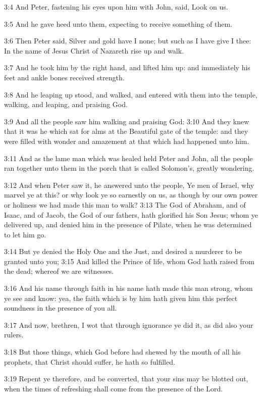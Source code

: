 3:4 And Peter, fastening his eyes upon him with John, said, Look on us.

3:5 And he gave heed unto them, expecting to receive something of them.

3:6 Then Peter said, Silver and gold have I none; but such as I have give I thee: In the name of Jesus Christ of Nazareth rise up and walk.

3:7 And he took him by the right hand, and lifted him up: and immediately his feet and ankle bones received strength.

3:8 And he leaping up stood, and walked, and entered with them into the temple, walking, and leaping, and praising God.

3:9 And all the people saw him walking and praising God: 3:10 And they knew that it was he which sat for alms at the Beautiful gate of the temple: and they were filled with wonder and amazement at that which had happened unto him.

3:11 And as the lame man which was healed held Peter and John, all the people ran together unto them in the porch that is called Solomon's, greatly wondering.

3:12 And when Peter saw it, he answered unto the people, Ye men of Israel, why marvel ye at this? or why look ye so earnestly on us, as though by our own power or holiness we had made this man to walk?  3:13 The God of Abraham, and of Isaac, and of Jacob, the God of our fathers, hath glorified his Son Jesus; whom ye delivered up, and denied him in the presence of Pilate, when he was determined to let him go.

3:14 But ye denied the Holy One and the Just, and desired a murderer to be granted unto you; 3:15 And killed the Prince of life, whom God hath raised from the dead; whereof we are witnesses.

3:16 And his name through faith in his name hath made this man strong, whom ye see and know: yea, the faith which is by him hath given him this perfect soundness in the presence of you all.

3:17 And now, brethren, I wot that through ignorance ye did it, as did also your rulers.

3:18 But those things, which God before had shewed by the mouth of all his prophets, that Christ should suffer, he hath so fulfilled.

3:19 Repent ye therefore, and be converted, that your sins may be blotted out, when the times of refreshing shall come from the presence of the Lord.

